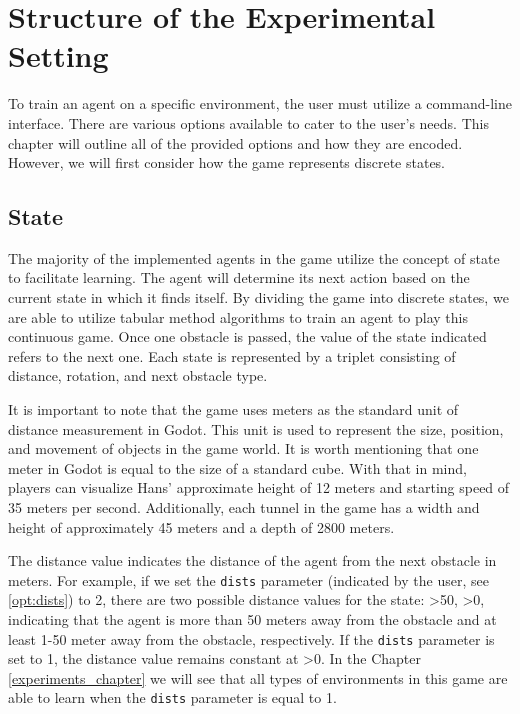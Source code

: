 \chapter{Structure of the Experimental Setting}
\label{agent_code_chapter}
To train an agent on a specific environment, the user must utilize a command-line interface. There are various options available to cater to the user's needs. This chapter will outline all of the provided options and how they are encoded. However, we will first consider how the game represents discrete states.

\section{State}
The majority of the implemented agents in the game utilize the concept of state to facilitate learning. The agent will determine its next action based on the current state in which it finds itself. By dividing the game into discrete states, we are able to utilize tabular method algorithms to train an agent to play this continuous game. Once one obstacle is passed, the value of the state indicated refers to the next one. Each state is represented by a triplet consisting of distance, rotation, and next obstacle type. 

It is important to note that the game uses meters as the standard unit of distance measurement in Godot. This unit is used to represent the size, position, and movement of objects in the game world. It is worth mentioning that one meter in Godot is equal to the size of a standard cube. With that in mind, players can visualize Hans' approximate height of 12 meters and starting speed of 35 meters per second. Additionally, each tunnel in the game has a width and height of approximately 45 meters and a depth of 2800 meters.

The distance value indicates the distance of the agent from the next obstacle in meters. For example, if we set the \texttt{dists} parameter (indicated by the user, see \ref{opt:dists}) to 2, there are two possible distance values for the state: \textgreater 50, \textgreater 0, indicating that the agent is more than 50 meters away from the obstacle and at least 1-50 meter away from the obstacle, respectively. If the \texttt{dists} parameter is set to 1, the distance value remains constant at \textgreater 0. In the Chapter \ref{experiments_chapter} we will see that all types of environments in this game are able to learn when the \texttt{dists} parameter is equal to 1.  

